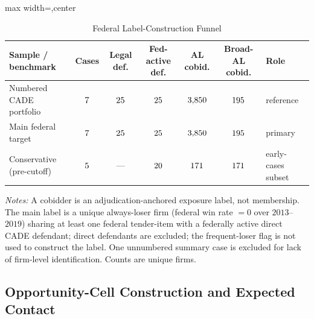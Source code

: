 \begin{table}[htbp]
\centering
\caption{Federal Label-Construction Funnel}
\label{supp:tab_federal_funnel}
\scriptsize
\begin{adjustbox}{max width=\textwidth,center}
\begin{threeparttable}
\begin{tabular}{p{3.6cm}cccccp{2.6cm}}
\toprule
Sample / benchmark & Cases & Legal def. & Fed-active def. & AL cobid. & Broad-AL cobid. & Role \\
\midrule
Numbered CADE portfolio & $7$ & $25$ & $25$ & $3{,}850$ & $195$ & reference \\
Main federal target & $7$ & $25$ & $25$ & $3{,}850$ & $195$ & primary \\
Conservative (pre-cutoff) & $5$ & --- & $20$ & $171$ & $171$ & early-cases subset \\
\bottomrule
\end{tabular}
\begin{tablenotes}
\scriptsize
\item \textit{Notes:} A cobidder is an adjudication-anchored exposure
label, not membership. The main label is a unique always-loser firm
(federal win rate $=0$ over $2013$--$2019$) sharing at least one federal
tender-item with a federally active direct CADE defendant; direct
defendants are excluded; the frequent-loser flag is not used to construct
the label. One unnumbered summary case is excluded for lack of firm-level
identification. Counts are unique firms.
\end{tablenotes}
\end{threeparttable}
\end{adjustbox}
\end{table}

\subsection{Opportunity-Cell Construction and Expected Contact}
\label{supp:federal_opp_cells}

